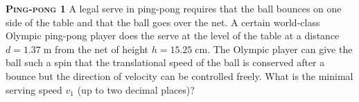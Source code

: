 \begin{problem}{\textbf{\textsc{Ping-pong 1}}} A legal serve in ping-pong requires that the ball bounces on one side of the table and that the ball goes over the net. A certain world-class Olympic ping-pong player does the serve at the level of the table at a distance $d=1.37\;\mathrm{m}$ from the net of height $h=15.25\;\mathrm{cm}$. The Olympic player can give the ball such a spin that the translational speed of the ball is conserved after a bounce but the direction of velocity can be controlled freely. What is the minimal serving speed $v_1$ (up to two decimal places)?

\end{problem}